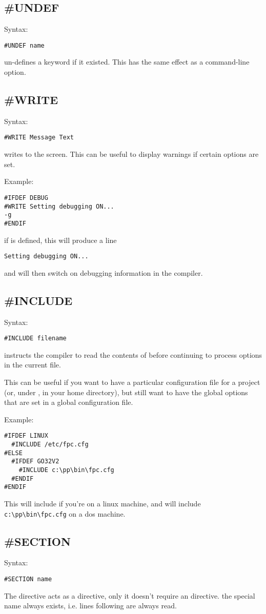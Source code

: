 \subsection{\#UNDEF}
Syntax:
\begin{verbatim}
#UNDEF name
\end{verbatim}
 un-defines a keyword if it existed.
This has the same effect as a   command-line option.

\subsection{\#WRITE}
Syntax:
\begin{verbatim}
#WRITE Message Text
\end{verbatim}
 writes  to the screen.
This can be useful to display warnings if certain options are set.

Example:
\begin{verbatim}
#IFDEF DEBUG
#WRITE Setting debugging ON...
-g
#ENDIF
\end{verbatim}
if  is defined, this will produce a line
\begin{verbatim}
Setting debugging ON...
\end{verbatim}
and will then switch on debugging information in the compiler.

\subsection{\#INCLUDE}
Syntax:
\begin{verbatim}
#INCLUDE filename
\end{verbatim}
 instructs the compiler to read the contents of
 before continuing to process options in the current file.

This can be useful if you want to have a particular configuration file
for a project (or, under \linux, in your home directory), but still want to
have the global options that are set in a global configuration file.

Example:
\begin{verbatim}
#IFDEF LINUX
  #INCLUDE /etc/fpc.cfg
#ELSE
  #IFDEF GO32V2
    #INCLUDE c:\pp\bin\fpc.cfg
  #ENDIF
#ENDIF
\end{verbatim}
This will include  if you're on a linux machine,
and will include \verb+c:\pp\bin\fpc.cfg+
on a dos machine.

\subsection{\#SECTION}
Syntax:
\begin{verbatim}
#SECTION name
\end{verbatim}
The  directive acts as a  directive, only
it doesn't require an  directive. the special name 
always exists, i.e. lines following  are always read.

